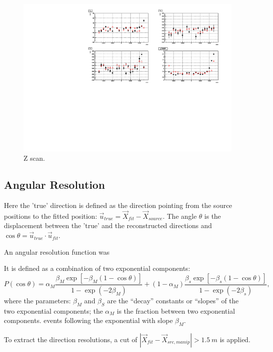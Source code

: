 \begin{figure}
	\centering
	\includegraphics[width=15cm]{MPW_N16_zscanResol_itrCut.pdf}
	\caption{Z scan.}
\label{MPWscanZResol}
\end{figure}

\subsection{Angular Resolution}


Here the 'true' direction is defined as the direction pointing from the source positions to the fitted position: $\vec{u}_{true} = \vec{X}_{fit}-\vec{X}_{source}$. The angle $\theta$ is the displacement between the 'true' and the reconstructed directions and $\cos\theta=\vec{u}_{true}\cdot \vec{u}_{fit}$.

An angular resolution function was 

It is defined as a combination of two exponential components:
\begin{equation}
P(\cos\theta)=\alpha_M\frac{\beta_M\exp[-\beta_M(1-\cos\theta)]}{1-\exp(-2\beta_M)}+(1-\alpha_M)\frac{\beta_s\exp[-\beta_s(1-\cos\theta)]}{1-\exp(-2\beta_s)},
\end{equation}
where the parameters: $\beta_M$ and $\beta_S$ are the ``decay'' constants or ``slopes'' of the two exponential components; the $\alpha_M$ is the fraction between two exponential components.
events following the exponential with slope $\beta_M$. 

To extract the direction resolutions, a cut of $|\vec{X}_{fit}-\vec{X}_{src,manip}|>1.5~m$ is applied.

